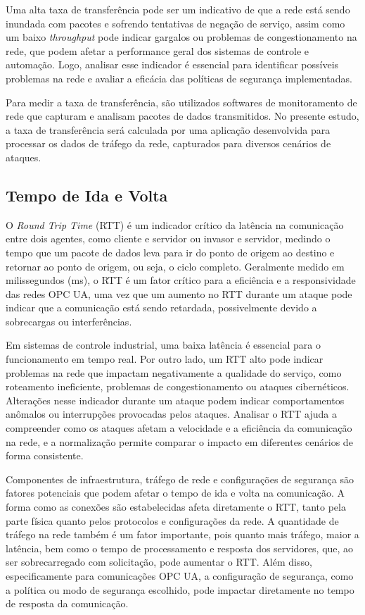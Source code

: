         Uma alta taxa de transferência pode ser um indicativo de que a rede está sendo inundada com pacotes e sofrendo tentativas de negação de serviço, assim como um baixo \textit{throughput} pode indicar gargalos ou problemas de congestionamento na rede, que podem afetar a performance geral dos sistemas de controle e automação. Logo, analisar esse indicador é essencial para identificar possíveis problemas na rede e avaliar a eficácia das políticas de segurança implementadas.
        
        Para medir a taxa de transferência, são utilizados softwares de monitoramento de rede que capturam e analisam pacotes de dados transmitidos. No presente estudo, a taxa de transferência será calculada por uma aplicação desenvolvida para processar os dados de tráfego da rede, capturados para diversos cenários de ataques.

    \subsection{Tempo de Ida e Volta}

        O \textit{Round Trip Time} (RTT) é um indicador crítico da latência na comunicação entre dois agentes, como cliente e servidor ou invasor e servidor, medindo o tempo que um pacote de dados leva para ir do ponto de origem ao destino e retornar ao ponto de origem, ou seja, o ciclo completo. Geralmente medido em milissegundos (ms), o RTT é um fator crítico para a eficiência e a responsividade das redes OPC UA, uma vez que um aumento no RTT durante um ataque pode indicar que a comunicação está sendo retardada, possivelmente devido a sobrecargas ou interferências.

        Em sistemas de controle industrial, uma baixa latência é essencial para o funcionamento em tempo real. Por outro lado, um RTT alto pode indicar problemas na rede que impactam negativamente a qualidade do serviço, como roteamento ineficiente, problemas de congestionamento ou ataques cibernéticos. Alterações nesse indicador durante um ataque podem indicar comportamentos anômalos ou interrupções provocadas pelos ataques. Analisar o RTT ajuda a compreender como os ataques afetam a velocidade e a eficiência da comunicação na rede, e a normalização permite comparar o impacto em diferentes cenários de forma consistente.
        
        Componentes de infraestrutura, tráfego de rede e configurações de segurança são fatores potenciais que podem afetar o tempo de ida e volta na comunicação. A forma como as conexões são estabelecidas afeta diretamente o RTT, tanto pela parte física quanto pelos protocolos e configurações da rede. A quantidade de tráfego na rede também é um fator importante, pois quanto mais tráfego, maior a latência, bem como o tempo de processamento e resposta dos servidores, que, ao ser sobrecarregado com solicitação, pode aumentar o RTT. Além disso, especificamente para comunicações OPC UA, a configuração de segurança, como a política ou modo de segurança escolhido, pode impactar diretamente no tempo de resposta da comunicação.

